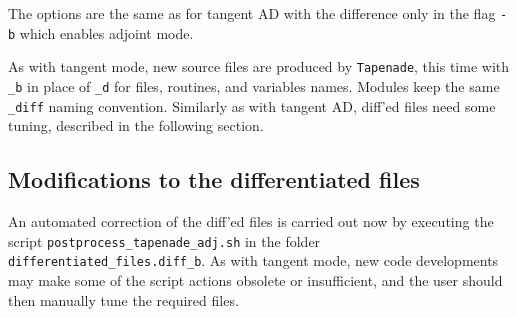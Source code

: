 The options are the same as for tangent AD with the difference only in the flag {\tt -b} which enables adjoint mode.

As with tangent mode, new source files are produced by {\tt Tapenade}, this time with {\tt \_b} in place of {\tt \_d} for files, routines, and variables names. Modules keep the same {\tt \_diff} naming convention. Similarly as with tangent AD, diff'ed files need some tuning, described in the following section.

\subsection{Modifications to the differentiated files}\label{sec:diff_files_adj}

An automated correction of the diff'ed files is carried out now by executing the script {\tt postprocess\_tapenade\_adj.\allowbreak sh} in the folder {\tt differentiated\_files.diff\_b}. As with tangent mode, new code developments may make some of the script actions obsolete or insufficient, and the user should then manually tune the required files.

